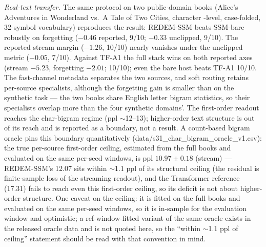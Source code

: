 \documentclass[preprint,12pt]{elsarticle}
\begin{document}
\emph{Real-text transfer.} The same protocol on two public-domain books
(Alice's Adventures in Wonderland vs.\ A Tale of Two Cities, character
-level, case-folded, 32-symbol vocabulary) reproduces the result:
REDEM-SSM beats SSM-bare robustly on forgetting ($-0.46$ reported,
9/10; $-0.33$ unclipped, 9/10). The reported stream margin ($-1.26$,
10/10) nearly vanishes under the unclipped metric ($-0.05$, 7/10).
Against TF-A1 the full stack wins on both reported axes (stream
$-5.23$, forgetting $-2.01$; 10/10); even
the bare host beats TF-A1 10/10. The fast-channel metadata separates the
two sources, and soft routing retains per-source specialists, although
the forgetting gain is smaller than on the synthetic task --- the two
books share English letter bigram statistics, so their specialists
overlap more than the four synthetic domains'. The first-order readout
reaches the char-bigram regime (ppl $\sim$12--13); higher-order text
structure is out of its reach and is reported as a boundary, not a
result. A count-based bigram oracle pins this boundary quantitatively
(data/s31\_char\_bigram\_oracle\_v1.csv): the true per-source first-order
ceiling, estimated from the full books and evaluated on the same
per-seed windows, is ppl $10.97\pm0.18$ (stream) --- REDEM-SSM's 12.07
sits within $\sim$1.1 ppl of its structural ceiling (the residual is
finite-sample loss of the streaming readout), and the Transformer
reference (17.31) fails to reach even this first-order ceiling, so its
deficit is not about higher-order structure. One caveat on the
ceiling: it is fitted on the full books and evaluated on the same
per-seed windows, so it is in-sample for the evaluation window and
optimistic; a ref-window-fitted variant of the same oracle exists in
the released oracle data and is not quoted here, so the ``within
$\sim$1.1 ppl of ceiling'' statement should be read with that
convention in mind.
\end{document}
